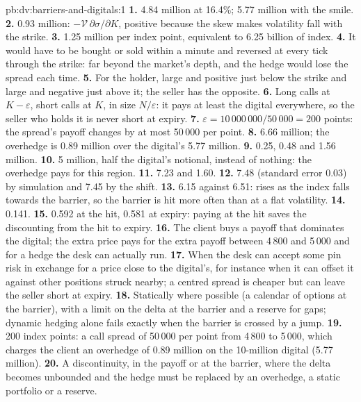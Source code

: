 \begin{solution}{pb:dv:barriers-and-digitals:1}
\textbf{1.} 4.84 million at 16.4\%; 5.77 million with the smile.
\textbf{2.} 0.93 million: $-\mathcal V\,\partial\sigma/\partial K$, positive because the skew makes volatility fall with the
strike.
\textbf{3.} 1.25 million per index point, equivalent to 6.25 billion of index.
\textbf{4.} It would have to be bought or sold within a minute and reversed at every tick through the strike: far beyond
the market's depth, and the hedge would lose the spread each time.
\textbf{5.} For the holder, large and positive just below the strike and large and negative just above it; the seller has
the opposite.
\textbf{6.} Long calls at $K-\varepsilon$, short calls at $K$, in size $N/\varepsilon$: it pays at least the digital
everywhere, so the seller who holds it is never short at expiry.
\textbf{7.} $\varepsilon=10\,000\,000/50\,000=200$ points: the spread's payoff changes by at most 50\,000 per point.
\textbf{8.} 6.66 million; the overhedge is 0.89 million over the digital's 5.77 million.
\textbf{9.} 0.25, 0.48 and 1.56 million.
\textbf{10.} 5 million, half the digital's notional, instead of nothing: the overhedge pays for this region.
\textbf{11.} 7.23 and 1.60.
\textbf{12.} 7.48 (standard error 0.03) by simulation and 7.45 by the shift.
\textbf{13.} 6.15 against 6.51:  rises as the index falls towards the barrier, so the barrier is hit more
often than at a flat volatility.
\textbf{14.} 0.141.
\textbf{15.} 0.592 at the hit, 0.581 at expiry: paying at the hit saves the discounting from the hit to expiry.
\textbf{16.} The client buys a payoff that dominates the digital; the extra price pays for the extra payoff between
4\,800 and 5\,000 and for a hedge the desk can actually run.
\textbf{17.} When the desk can accept some pin risk in exchange for a price close to the digital's, for instance when it
can offset it against other positions struck nearby; a centred spread is cheaper but can leave the seller short at
expiry.
\textbf{18.} Statically where possible (a calendar of options at the barrier), with a limit on the delta at the barrier and a
reserve for gaps; dynamic hedging alone fails exactly when the barrier is crossed by a jump.
\textbf{19.} 200 index points: a call spread of 50\,000 per point from 4\,800 to 5\,000, which charges the client an
overhedge of 0.89 million on the 10-million digital (5.77 million).
\textbf{20.} A discontinuity, in the payoff or at the barrier, where the delta becomes unbounded and the hedge must be
replaced by an overhedge, a static portfolio or a reserve.
\end{solution}

